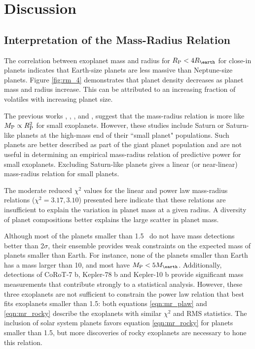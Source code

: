 \documentclass[iop]{emulateapj}
\begin{document}

\section{Discussion}
	
\subsection{Interpretation of the Mass-Radius Relation}
The correlation between exoplanet mass and radius for $\rpl < 4 \rearth$ for close-in planets indicates that Earth-size planets are less massive than Neptune-size planets.  Figure \ref{fig:rm_4} demonstrates that planet density decreases as planet mass and radius increase.  This can be attributed to an increasing fraction of volatiles with increasing planet size.

The previous works \citet{Lissauer2011}, \citet{Enoch2012}, \citet{Kane2012}, and \citet{Weiss2013}, suggest that the mass-radius relation is more like $M_{\rm P} \propto R_{\rm P}^2$ for small exoplanets.  However, these studies include Saturn or Saturn-like planets at the high-mass end of their ``small planet" populations.  Such planets are better described as part of the giant planet population and are not useful in determining an empirical mass-radius relation of predictive power for small exoplanets.  Excluding Saturn-like planets gives a linear (or near-linear) mass-radius relation for small planets.

The moderate reduced $\chi^2$ values for the linear and power law mass-radius relations ($\chi^2 = 3.17, 3.10$) presented here indicate that these relations are insufficient to explain the variation in planet mass at a given radius.  A diversity of planet compositions better explains the large scatter in planet mass.

Although most of the planets smaller than 1.5 \rearth\ do not have mass detections better than 2$\sigma$, their ensemble provides weak constraints on the expected mass of planets smaller than Earth.  For instance, none of the planets smaller than Earth has a mass larger than 10\mearth, and most have $\mpl < 5\mearth$.  Additionally, detections of CoRoT-7 b, Kepler-78 b and Kepler-10 b provide significant mass measurements that contribute strongly to a statistical analysis.  However, these three exoplanets are not sufficient to constrain the power law relation that best fits exoplanets smaller than 1.5\rearth: both equations \ref{eqn:mr_plaw} and \ref{eqn:mr_rocky} describe the exoplanets with similar $\chi^2$ and RMS statistics.  The inclusion of solar system planets favors equation \ref{eqn:mr_rocky} for planets smaller than 1.5\rearth, but more discoveries of rocky exoplanets are necessary to hone this relation.
\end{document}
